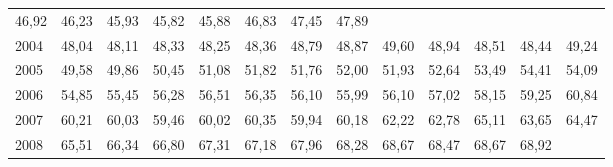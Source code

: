 \begin{tabular}{lllllllllllll}
  \multicolumn{1}{r}{46,92} &
  \multicolumn{1}{r}{46,23} &
  \multicolumn{1}{r}{45,93} &
  \multicolumn{1}{r}{45,82} &
  \multicolumn{1}{r}{45,88} &
  \multicolumn{1}{r}{46,83} &
  \multicolumn{1}{r}{47,45} &
  \multicolumn{1}{r}{47,89} \\
\multicolumn{1}{l}{\hspace{1em}2004} &
  \multicolumn{1}{|r}{48,04} &
  \multicolumn{1}{r}{48,11} &
  \multicolumn{1}{r}{48,33} &
  \multicolumn{1}{r}{48,25} &
  \multicolumn{1}{r}{48,36} &
  \multicolumn{1}{r}{48,79} &
  \multicolumn{1}{r}{48,87} &
  \multicolumn{1}{r}{49,60} &
  \multicolumn{1}{r}{48,94} &
  \multicolumn{1}{r}{48,51} &
  \multicolumn{1}{r}{48,44} &
  \multicolumn{1}{r}{49,24} \\
\multicolumn{1}{l}{\hspace{1em}2005} &
  \multicolumn{1}{|r}{49,58} &
  \multicolumn{1}{r}{49,86} &
  \multicolumn{1}{r}{50,45} &
  \multicolumn{1}{r}{51,08} &
  \multicolumn{1}{r}{51,82} &
  \multicolumn{1}{r}{51,76} &
  \multicolumn{1}{r}{52,00} &
  \multicolumn{1}{r}{51,93} &
  \multicolumn{1}{r}{52,64} &
  \multicolumn{1}{r}{53,49} &
  \multicolumn{1}{r}{54,41} &
  \multicolumn{1}{r}{54,09} \\
\multicolumn{1}{l}{\hspace{1em}2006} &
  \multicolumn{1}{|r}{54,85} &
  \multicolumn{1}{r}{55,45} &
  \multicolumn{1}{r}{56,28} &
  \multicolumn{1}{r}{56,51} &
  \multicolumn{1}{r}{56,35} &
  \multicolumn{1}{r}{56,10} &
  \multicolumn{1}{r}{55,99} &
  \multicolumn{1}{r}{56,10} &
  \multicolumn{1}{r}{57,02} &
  \multicolumn{1}{r}{58,15} &
  \multicolumn{1}{r}{59,25} &
  \multicolumn{1}{r}{60,84} \\
\multicolumn{1}{l}{\hspace{1em}2007} &
  \multicolumn{1}{|r}{60,21} &
  \multicolumn{1}{r}{60,03} &
  \multicolumn{1}{r}{59,46} &
  \multicolumn{1}{r}{60,02} &
  \multicolumn{1}{r}{60,35} &
  \multicolumn{1}{r}{59,94} &
  \multicolumn{1}{r}{60,18} &
  \multicolumn{1}{r}{62,22} &
  \multicolumn{1}{r}{62,78} &
  \multicolumn{1}{r}{65,11} &
  \multicolumn{1}{r}{63,65} &
  \multicolumn{1}{r}{64,47} \\
\multicolumn{1}{l}{\hspace{1em}2008} &
  \multicolumn{1}{|r}{65,51} &
  \multicolumn{1}{r}{66,34} &
  \multicolumn{1}{r}{66,80} &
  \multicolumn{1}{r}{67,31} &
  \multicolumn{1}{r}{67,18} &
  \multicolumn{1}{r}{67,96} &
  \multicolumn{1}{r}{68,28} &
  \multicolumn{1}{r}{68,67} &
  \multicolumn{1}{r}{68,47} &
  \multicolumn{1}{r}{68,67} &
  \multicolumn{1}{r}{68,92} &

\end{tabular}
